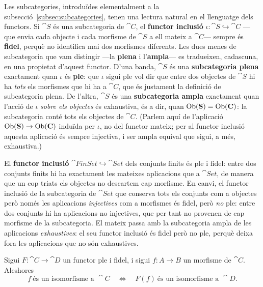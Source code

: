Les subcategories, introduïdes elementalment a la subsecció~\ref{subsec:subcategories}, tenen una lectura natural en el llenguatge dels functors. Si $\cat{S}$ és una subcategoria de $\cat{C}$, el \textbf{functor inclusió} $\iota\colon\cat{S}\hookrightarrow\cat{C}$ ---que envia cada objecte i cada morfisme de $\cat{S}$ a ell mateix a $\cat{C}$--- sempre és \textbf{fidel}, perquè no identifica mai dos morfismes diferents. Les dues menes de subcategoria que vam distingir ---la \textbf{plena} i l'\textbf{ampla}--- es tradueixen, cadascuna, en una propietat d'aquest functor. D'una banda, $\cat{S}$ és una \textbf{subcategoria plena} exactament quan $\iota$ és \textbf{ple}: que $\iota$ sigui ple vol dir que entre dos objectes de $\cat{S}$ hi ha \emph{tots} els morfismes que hi ha a $\cat{C}$, que és justament la definició de subcategoria plena. De l'altra, $\cat{S}$ és una \textbf{subcategoria ampla} exactament quan l'acció de $\iota$ \emph{sobre els objectes} és exhaustiva, és a dir, quan $\operatorname{Ob}(\mathbf{S})=\operatorname{Ob}(\mathbf{C})$: la subcategoria conté tots els objectes de $\cat{C}$. (Parlem aquí de l'aplicació $\operatorname{Ob}(\mathbf{S})\to\operatorname{Ob}(\mathbf{C})$ induïda per $\iota$, no del functor mateix; per al functor inclusió aquesta aplicació és sempre injectiva, i ser ampla equival que sigui, a més, exhaustiva.)

\begin{exemple}\label{ex:inclusio-finset-plena}
El \textbf{functor inclusió} $\cat{FinSet}\hookrightarrow\cat{Set}$ dels conjunts finits és ple i fidel: entre dos conjunts finits hi ha exactament les mateixes aplicacions que a $\cat{Set}$, de manera que un cop triats els objectes no descartem cap morfisme. En canvi, el functor inclusió de la subcategoria de $\cat{Set}$ que conserva tots els conjunts com a objectes però només les aplicacions \emph{injectives} com a morfismes és fidel, però \emph{no} ple: entre dos conjunts hi ha aplicacions no injectives, que per tant no provenen de cap morfisme de la subcategoria. El mateix passa amb la subcategoria ampla de les aplicacions \emph{exhaustives}: el seu functor inclusió és fidel però no ple, perquè deixa fora les aplicacions que no són exhaustives.
\end{exemple}

\begin{proposicio}\label{prop:plenfidel-reflecteix-iso}
Sigui $F\colon\cat{C}\to\cat{D}$ un functor ple i fidel, i sigui $f\colon A\to B$ un morfisme de $\cat{C}$. Aleshores
\[
f\ \text{és un isomorfisme a }\cat{C}
\quad\Longleftrightarrow\quad
F(f)\ \text{és un isomorfisme a }\cat{D}.
\]
\end{proposicio}

